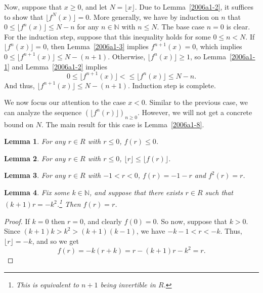 \documentclass{article}
\newcommand{\N}{\mathbb{N}}
\newtheorem{lemma}{Lemma}
\begin{document}
Now, suppose that $x \geq 0$, and let $N = \lfloor x \rfloor$.
Due to Lemma~\ref{2006a1-2}, it suffices to show that $\lfloor f^N(x) \rfloor = 0$.
More generally, we have by induction on $n$ that $0 \leq \lfloor f^n(x) \rfloor \leq N - n$ for any $n \in \N$ with $n \leq N$.
The base case $n = 0$ is clear.
For the induction step, suppose that this inequality holds for some $0 \leq n < N$.
If $\lfloor f^n(x) \rfloor = 0$, then Lemma~\ref{2006a1-3} implies $f^{n + 1}(x) = 0$, which implies $0 \leq \lfloor f^{n + 1}(x) \rfloor \leq N - (n + 1)$.
Otherwise, $\lfloor f^n(x) \rfloor \geq 1$, so Lemma~\ref{2006a1-1} and Lemma~\ref{2006a1-2} implies
\[ 0 \leq \lfloor f^{n + 1}(x) \rfloor < \leq \lfloor f^{n}(x) \rfloor \leq N - n. \]
And thus, $\lfloor f^{n + 1}(x) \rfloor \leq N - (n + 1)$.
Induction step is complete.

We now focus our attention to the case $x < 0$.
Similar to the previous case, we can analyze the sequence $(\lfloor f^n(r) \rfloor)_{n \geq 0}$.
However, we will not get a concrete bound on $N$.
The main result for this case is Lemma~\ref{2006a1-8}.

\begin{lemma}\label{2006a1-4}
For any $r \in R$ with $r \leq 0$, $f(r) \leq 0$.
\end{lemma}
    
\begin{lemma}\label{2006a1-5}
For any $r \in R$ with $r \leq 0$, $\lfloor r \rfloor \leq \lfloor f(r) \rfloor$.
\end{lemma}
    
\begin{lemma}\label{2006a1-6}
For any $r \in R$ with $-1 < r < 0$, $f(r) = -1 - r$ and $f^2(r) = r$.
\end{lemma}

\begin{lemma}\label{2006a1-7}
Fix some $k \in \N$, and suppose that there exists $r \in R$ such that $(k + 1)r = -k^2$.\footnote{This is equivalent to $n + 1$ being invertible in $R$.}
Then $f(r) = r$.
\end{lemma}
\begin{proof}
If $k = 0$ then $r = 0$, and clearly $f(0) = 0$.
So now, suppose that $k > 0$.
Since $(k + 1)k > k^2 > (k + 1)(k - 1)$, we have $-k - 1 < r < -k$.
Thus, $\lfloor r \rfloor = -k$, and so we get
\[ f(r) = -k (r + k) = r -(k + 1)r - k^2 = r. \]
\end{proof}
\end{document}

